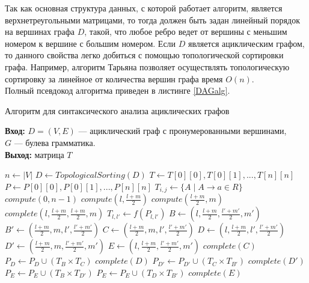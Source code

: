 Так как основная структура данных, с которой работает алгоритм,
является верхнетреугольными матрицами, то тогда должен быть
задан линейный порядок на вершинах графа $D$, такой, что любое
ребро ведет от вершины с меньшим номером к вершине с
большим номером. Если $D$ является ациклическим графом, то
данного свойства легко добиться с помощью топологической
сортировки графа. Например, алгоритм Тарьяна \cite{Tarjan} позволяет
осуществлять топологическую сортировку за линейное от
количества вершин графа время $O(n)$.
\\
Полный псевдокод алгоритма приведен в листинге \ref{DAGalg}.
\begin{algorithm}
\caption{Алгоритм для синтаксического анализа ациклических графов}\label{DAGalg}
 \hspace*{\algorithmicindent} \textbf{Вход:} $D = (V, E)$ --- ациклический граф с пронумерованными вершинами, \\$G$ ---  булева грамматика.\\
 \hspace*{\algorithmicindent} \textbf{Выход:} матрица $T$
\begin{algorithmic}[1]
\State $n \gets  |V|$
\State $D \gets TopologicalSorting(D)$
\State $T \gets T[0][0], T[0][1], ... , T[n] [n]$
\State $P \gets P[0][0], P[0][1], ... , P[n] [n]$
\State $T_{i,j} \gets \{A \mid A \to a \in R\}$
\EndFor
\State $compute(0, n-1)$
\State $compute(l, \frac{l+m}{2})$
\State $compute(\frac{l+m}{2},m)$
\EndIf
\State $complete(l, \frac{l+m}{2}, \frac{l+m}{2}, m)$
\EndProcedure
{}
\State $T_{l,l'} \gets f(P_{l,l'})$
\State $B \gets (l, \frac{l+m}{2}, \frac{l'+m'}{2}, m')$
\State $B' \gets (\frac{l+m}{2}, m, l', \frac{l'+m'}{2})$
\State $C \gets (\frac{l+m}{2}, m, l', \frac{l'+m'}{2})$
\State $D \gets (l, \frac{l+m}{2}, l', \frac{l'+m'}{2})$
\State $D' \gets (\frac{l+m}{2}, m, \frac{l'+m'}{2}, m')$
\State $E \gets (l, \frac{l+m}{2}, \frac{l'+m'}{2}, m')$
\State $complete(C)$
\State $P_D \gets P_D \cup (T_B \times T_C)$
\State $complete(D)$
\State $P_{D'} \gets P_{D'} \cup (T_C \times T_{B'})$
\State $complete(D')$
\State $P_{E} \gets P_{E} \cup (T_B \times T_{D'})$
\State $P_{E} \gets P_{E} \cup (T_D \times T_{B'})$
\State $complete(E)$
\EndIf

\EndProcedure

\end{algorithmic}
\end{algorithm}

